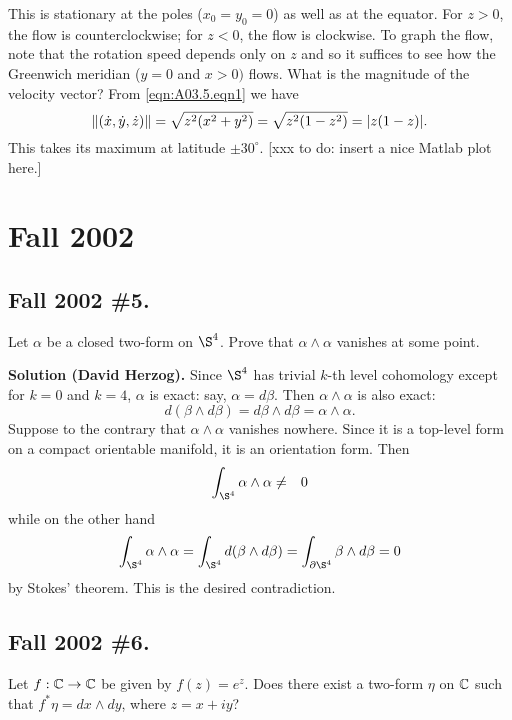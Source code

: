 \documentclass[10pt]{article}
\numberwithin{equation}{subsection}
\begin{document}
This is stationary at the poles ($x_0=y_0=0$) as well as at the equator.  For
$z>0$, the flow is counterclockwise; for $z<0$, the flow is clockwise.  To
graph the flow,  note that the rotation speed depends only on $z$ and so it
suffices to see how the Greenwich meridian ($y=0$ and $x>0)$ flows.  What is
the magnitude of the velocity vector?  From \ref{eqn:A03.5.eqn1} we have
$$
	\|(\dot{x}, \dot{y}, \dot{z})\| = \sqrt{z^2(x^2+y^2)} = \sqrt{z^2(1-z^2)}
	= |z(1-z)|.
$$
This takes its maximum at latitude $\pm 30^\circ$.
[xxx to do:  insert a nice Matlab plot here.]

\newpage
\section{Fall 2002}

\subsection{Fall 2002 \#5.}

Let $\alpha$ be a closed two-form on $\S^4$.  Prove that $\alpha \wedge \alpha$
vanishes at some point.

\textbf{Solution (David Herzog).}  Since $\S^4$ has trivial $k$-th level
cohomology except for $k=0$ and $k=4$, $\alpha$ is exact: say, $\alpha =
d\beta$.  Then $\alpha\wedge\alpha$ is also exact:
$$
	d(\beta \wedge d\beta) = d\beta \wedge d\beta = \alpha \wedge \alpha.
$$
Suppose to the contrary that $\alpha \wedge \alpha$ vanishes nowhere.  Since it
is a top-level form on a compact orientable manifold, it is an orientation
form.  Then
\begin{eqnarray*}
	\int_{\S^4} \alpha \wedge \alpha &\ne& 0
\end{eqnarray*}
while on the other hand
\begin{eqnarray*}
	\int_{\S^4} \alpha \wedge \alpha
	= \int_{\S^4} d(\beta \wedge d\beta)
	= \int_{\D\S^4} \beta \wedge d\beta
	= 0
\end{eqnarray*}
by Stokes' theorem.  This is the desired contradiction.

\subsection{Fall 2002 \#6.}

Let $f:\mathbb{C} \to \mathbb{C}$ be given by $f(z) = e^z$.  Does there exist a two-form $\eta$
on $\mathbb{C}$ such that $f^*\eta = dx\wedge dy$, where $z=x+iy$?
\end{document}
